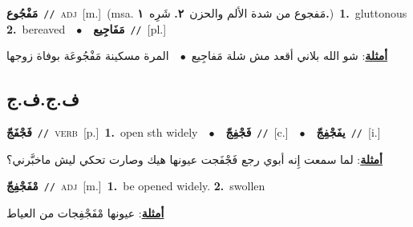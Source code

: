\documentclass[10pt,a4paper,twoside]{article} %
\begin{document}
\begin{multicols}{2}
{\setlength\topsep{0pt}\textbf{\foreignlanguage{arabic}{مَفْجُوع}}\ {\color{gray}\texttt{//}\color{black}}\ \textsc{adj}\ [m.]\ \color{gray}(msa. \foreignlanguage{arabic}{مَفجوع من شدة الألم والحزن}~\foreignlanguage{arabic}{\textbf{٢.}}  \foreignlanguage{arabic}{شَرِه}~\foreignlanguage{arabic}{\textbf{١.}})\color{black}\ \textbf{1.}~gluttonous  \textbf{2.}~bereaved\ \ $\bullet$\ \ \setlength\topsep{0pt}\textbf{\foreignlanguage{arabic}{مَفَاجِيع}}\ {\color{gray}\texttt{//}\color{black}}\ [pl.]\  \begin{flushright}\color{gray}\foreignlanguage{arabic}{\textbf{\underline{\foreignlanguage{arabic}{أمثلة}}}: شو الله بلاني أقعد مش شلة مَفاجِيع\ $\bullet$\ \  المرة مسكينة مَفْجُوعَة بوفاة زوجها}\end{flushright}\color{black}} \vspace{2mm}

\vspace{-3mm}
\subsection*{\color{blue}\foreignlanguage{arabic}{ف.ج.ف.ج}\color{blue}{}} 

{\setlength\topsep{0pt}\textbf{\foreignlanguage{arabic}{فَجْفَجّ}}\ {\color{gray}\texttt{//}\color{black}}\ \textsc{verb}\ [p.]\ \textbf{1.}~open sth widely\ \ $\bullet$\ \ \setlength\topsep{0pt}\textbf{\foreignlanguage{arabic}{فَجْفِجّ}}\ {\color{gray}\texttt{//}\color{black}}\ [c.]\ \ $\bullet$\ \ \setlength\topsep{0pt}\textbf{\foreignlanguage{arabic}{يفَجْفِجّ}}\ {\color{gray}\texttt{//}\color{black}}\ [i.]\  \begin{flushright}\color{gray}\foreignlanguage{arabic}{\textbf{\underline{\foreignlanguage{arabic}{أمثلة}}}: لما سمعت إِنه أبوي رجع فَجْفَجت عيونها هيك وصارت تحكي ليش ماخبَّرني؟}\end{flushright}\color{black}} \vspace{2mm}

{\setlength\topsep{0pt}\textbf{\foreignlanguage{arabic}{مْفَجْفِجّ}}\ {\color{gray}\texttt{//}\color{black}}\ \textsc{adj}\ [m.]\ \textbf{1.}~be opened widely.  \textbf{2.}~swollen\  \begin{flushright}\color{gray}\foreignlanguage{arabic}{\textbf{\underline{\foreignlanguage{arabic}{أمثلة}}}: عيونها مْفَجْفِجات من العياط}\end{flushright}\color{black}} \vspace{2mm}


\end{multicols}
\end{document}
